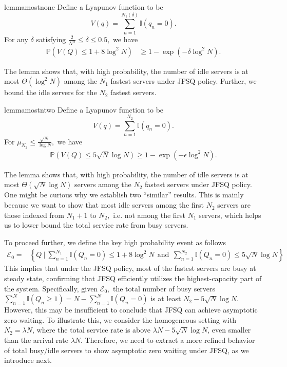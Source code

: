 \documentclass[11pt,oneside,letter]{article}
\begin{document}
\begin{restatable}{lemma}{mostnone}\label{lem:most n1}
Define a Lyapunov function to be $$V(q)=\sum_{n=1}^{N_1(\delta)}\mathbb{I}(q_n=0).$$ For any $\delta$ satisfying $\frac{2}{N^\alpha} \leq \delta\leq 0.5,$ we have 
\begin{align*}
  \mathbb P\left(V(Q)\leq 1 + 8\log^2 N \right)&\geq 1- \exp\left(-{\delta}\log^2 N\right).
\end{align*}
\end{restatable}
The lemma shows that, with high probability, the number of idle servers is at most $\Theta(\log^2 N)$  among the $N_1$ fastest servers under JFSQ policy. Further, we bound the idle servers for the $N_2$ fastest servers.
\begin{restatable}{lemma}{mostntwo}\label{lem:most n2}
Define a Lyapunov function to be $$V(q)=\sum_{n=1}^{N_2}\mathbb{I}(q_n=0).$$
For $\mu_{N_2} \leq \frac{\sqrt{N}}{\log N},$ we have 
\begin{align*}
  \mathbb P\left(V(Q)\leq 5\sqrt{N} \log N \right)\geq 1-\exp\left(-\epsilon\log^2 N\right).
\end{align*}
\end{restatable}
The lemma shows that, with high probability, the number of idle servers is at most $\Theta(\sqrt{N}\log N)$ servers among the $N_2$ fastest servers under JFSQ policy. One might be curious why we establish two ``similar'' results. This is mainly because we want to show that most idle servers among the first $N_2$ servers are those indexed from $N_1+1$ to $N_2,$ i.e. not among the first $N_1$ servers, which helps us to lower bound the total service rate from busy servers.    

To proceed further, we define the key high probability event as follows 
\begin{align}
\mathcal E_{0}=&\left\{Q~|~ 
 \sum_{n=1}^{N_1}\mathbb{I}(Q_n = 0) \leq 1 + 8\log^2 N ~~\text{and}~~ \sum_{n=1}^{N_2}\mathbb{I}(Q_n = 0) \leq 5\sqrt{N}\log N \right\} \label{eq: most}
\end{align}
This implies that under the JFSQ policy, most of the fastest servers are busy at steady state, confirming that JFSQ efficiently utilizes the highest-capacity part of the system. 
Specifically, given $\mathcal E_0,$ the total number of busy servers $\sum_{n=1}^{N} \mathbb I(Q_n \geq 1) = N - \sum_{n=1}^{N} \mathbb I(Q_n = 0)$ is at least $N_2-5\sqrt{N}\log N$. However, this may be insufficient to conclude that JFSQ can achieve asymptotic zero waiting. To illustrate this, we consider the homogeneous setting with $N_2 = \lambda N$, where the total service rate is above $\lambda N-5\sqrt{N}\log N$, even smaller than the arrival rate $\lambda N$. Therefore, we need to extract a more refined behavior of total busy/idle servers to show asymptotic zero waiting under JFSQ, as we introduce next. 
\end{document}
